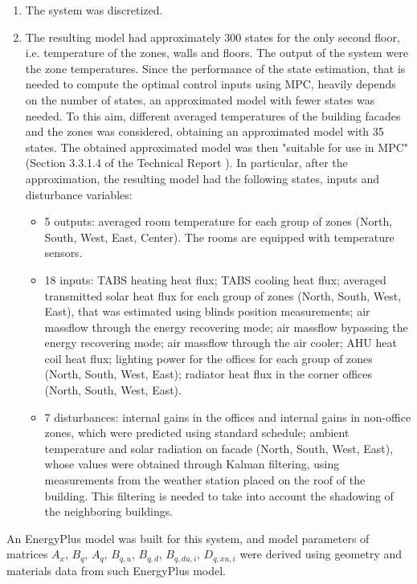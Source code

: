 {\begin{enumerate}
\begin{itemize}
		\item effects due to the AHU were considered.
	\end{itemize}
	\item The system was discretized.
	\item The resulting model had approximately 300 states for the only second floor, i.e. temperature of the zones, walls and floors. The output of the system were the zone temperatures.
	Since the performance of the state estimation, that is needed to compute the optimal control inputs using MPC, heavily depends on the number of states, an approximated model with fewer states was needed.
	To this aim, different averaged temperatures of the building facades and the zones was considered, obtaining an approximated model with 35 states. The obtained approximated model was then "suitable for use in MPC" (Section 3.3.1.4 of the Technical Report \cite{SturzeneggerTR}). In particular, after the approximation, the resulting model had the following states, inputs and disturbance variables:
	\begin{itemize}
		\item 5 outputs: averaged room temperature for each group of zones (North, South, West, East, Center). The rooms are equipped with temperature sensors.
		\item 18 inputs: TABS heating heat flux; TABS cooling heat flux; averaged transmitted solar heat flux for each group of zones (North, South, West, East), that was estimated using blinds position measurements; air massflow through the energy recovering mode; air massflow bypassing the energy recovering mode; air massflow through the air cooler; AHU heat coil heat flux; lighting power for the offices for each group of zones (North, South, West, East); radiator heat flux in the corner offices (North, South, West, East).
		\item 7 disturbances: internal gains in the offices and internal gains in non-office zones, which were predicted using standard schedule; ambient temperature and solar radiation on facade (North, South, West, East), whose values were obtained through Kalman filtering, using measurements from the weather station placed on the roof of the building. This filtering is needed to take into account the shadowing of the neighboring buildings.
	\end{itemize}
\end{enumerate}
An EnergyPlus model was built for this system, and model parameters of matrices $A_x$, $B_q$, $A_q$, $B_{q,u}$, $B_{q,d}$, $B_{q,du,i}$, $D_{q,xu,i}$ were derived using geometry and materials data from such EnergyPlus model.
}
